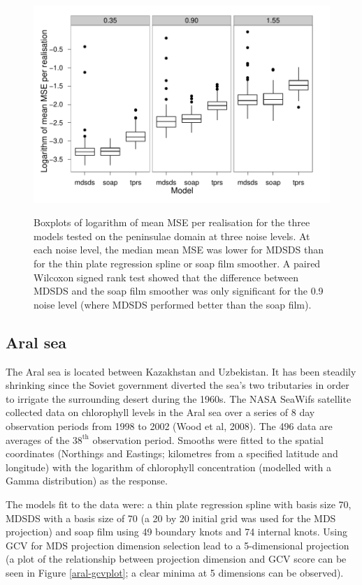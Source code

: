 \documentclass[useAMS, referee]{biom}
\begin{document}
\begin{figure}
\centering
\includegraphics{examples/wt2/wt2-result.pdf} \\
\caption{Boxplots of logarithm of mean MSE per realisation for the three models tested on the peninsulae domain at three noise levels. At each noise level, the median mean MSE was lower for MDSDS than for the thin plate regression spline or soap film smoother. A paired Wilcoxon signed rank test showed that the difference between MDSDS and the soap film smoother was only significant for the 0.9 noise level (where MDSDS performed better than the soap film).}
\label{wt2-boxplots}
\end{figure}



\subsection{Aral sea}

The Aral sea is located between Kazakhstan and Uzbekistan. It has been steadily shrinking since the Soviet government diverted the sea's two tributaries in order to irrigate the surrounding desert during the 1960s. The NASA SeaWifs satellite collected data on chlorophyll levels in the Aral sea over a series of 8 day observation periods from 1998 to 2002 (Wood et al, 2008). The 496 data are averages of the $38^\text{th}$ observation period. Smooths were fitted to the spatial coordinates (Northings and Eastings; kilometres from a specified latitude and longitude) with the logarithm of chlorophyll concentration (modelled with a Gamma distribution) as the response.

The models fit to the data were: a thin plate regression spline with basis size 70, MDSDS with a basis size of 70 (a 20 by 20 initial grid was used for the MDS projection) and soap film using 49 boundary knots and 74 internal knots. Using GCV for MDS projection dimension selection lead to a 5-dimensional projection (a plot of the relationship between projection dimension and GCV score can be seen in Figure \ref{aral-gcvplot}; a clear minima at 5 dimensions can be observed).
\end{document}
